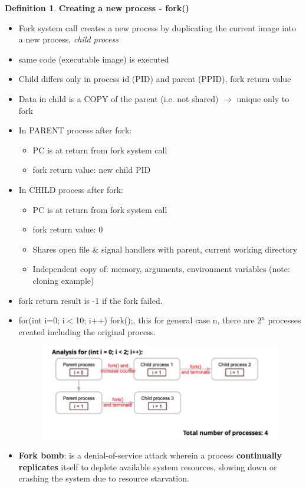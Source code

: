 \documentclass[12pt,a4paper]{article}
\theoremstyle{definition}
\newtheorem{definition}{Definition}[section]
\newenvironment{myitemize}
{ \begin{itemize}
    \setlength{\itemsep}{5pt}
    \setlength{\parskip}{0pt}
    \setlength{\parsep}{0pt}     }
{ \end{itemize}                  }
\begin{document}
\begin{definition}{\textbf{Creating a new process - \textsf{fork()}}}
	\begin{myitemize}
		\item Fork system call creates a new process by duplicating the current image into a new process, \textit{child process}
		\item \textsf{same code} (executable image) is executed
		\item Child differs only in process id (PID) and parent (PPID), fork return value
		\item Data in child is a COPY of the parent (i.e. not shared) $\rightarrow$ unique only to fork
		\item In PARENT process after fork:
		\begin{myitemize}
			\item PC is at return from fork system call
			\item fork return value: new child PID
		\end{myitemize}
		\item In CHILD process after fork:
		\begin{myitemize}
			\item PC is at return from fork system call
			\item fork return value: 0
			\item Shares open file \& signal handlers with parent, current working directory
			\item Independent copy of: memory, arguments, environment variables (note: cloning example)
		\end{myitemize}
		\item fork return result is -1 if the fork failed.
		\item \textsf{for(int i=0; i$<$10; i++) fork();}, this for general case n, there are $2^n$ processes created including the original process. 
		\begin{figure}[!h]
			\includegraphics[scale=0.3]{m1/forkBomb}
			\centering
		\end{figure}
		\item \textbf{Fork bomb}: is a denial-of-service attack wherein a process \textbf{continually replicates} itself to deplete available system resources, slowing down or crashing the system due to resource starvation.
	\end{myitemize}
\end{definition}
\end{document}
